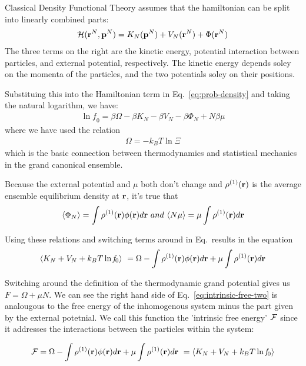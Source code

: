 Classical Density Functional Theory assumes that the hamiltonian can
be split into linearly combined parts:
\begin{align}\label{eq:hamiltonian}
  \mathcal{H}(\textbf{r}^N,\mathbf{p}^N) = K_N(\mathbf{p}^N) + V_N(\textbf{r}^N) + \Phi(\textbf{r}^N)
\end{align}
The three terms on the right are the kinetic energy, potential
interaction between particles, and external potential, respectively.
The kinetic energy depends soley on the momenta of the particles, and
the two potentials soley on their positions.

Substituing this into the Hamiltonian term in
Eq.~\ref{eq:prob-density} and taking the natural logarithm, we have:
\begin{align}
  \ln \mathit{f}_0 = \beta\Omega - \beta K_N - \beta V_N - \beta \Phi_N + N\beta \mu
\end{align}
where we have used the relation
\begin{align}
  \Omega = -k_BT\ln\Xi
\end{align}
which is the basic connection between thermodynamics and statistical
mechanics in the grand canonical ensemble.

Because the external potential and $\mu$ both don't change and
$\rho^{(1)}(\textbf{r})$ is the average ensemble equilibrium density at
$\textbf{r}$, it's true that
\begin{align}
  \langle \Phi_N \rangle = \int \rho^{(1)}(\textbf{r})\phi(\textbf{r})d\textbf{r} \
  and \
  \langle N\mu \rangle = \mu \int \rho^{(1)}(\textbf{r}) d\textbf{r}
\end{align}

Using these relations and switching terms around in Eq.~{}results in the equation
\begin{align} \label{eq:intrinsic-free-two}
  \langle K_N + V_N + k_BT \ln \mathit{f}_0 \rangle \
  = \Omega - \int \rho^{(1)}(\textbf{r})\phi(\textbf{r})d\textbf{r} + \mu \int \rho^{(1)}(\textbf{r})d\textbf{r}
\end{align}


Switching around the definition of the thermodynamic grand potential
gives us $F = \Omega + \mu N$.  We can see the right hand side of
Eq.~\ref{eq:intrinsic-free-two} is analougous to the free energy of the
inhomogenous system minus the part given by the external potetnial.
We call this function the 'intrinsic free energy' $\mathcal{F}$ since it
addresses the interactions between the particles within the system:

\begin{align}
  \mathcal{F} = \Omega - \int \rho^{(1)}(\textbf{r})\phi(\textbf{r})d\textbf{r} + \mu \int \rho^{(1)}(\textbf{r})d\textbf{r} \
  = \langle K_N + V_N + k_BT \ln \mathit{f}_0 \rangle
\end{align}

